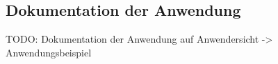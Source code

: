 \subsection{Dokumentation der Anwendung}
\label{subsec:documentation}

TODO: Dokumentation der Anwendung auf Anwendersicht -> Anwendungsbeispiel
